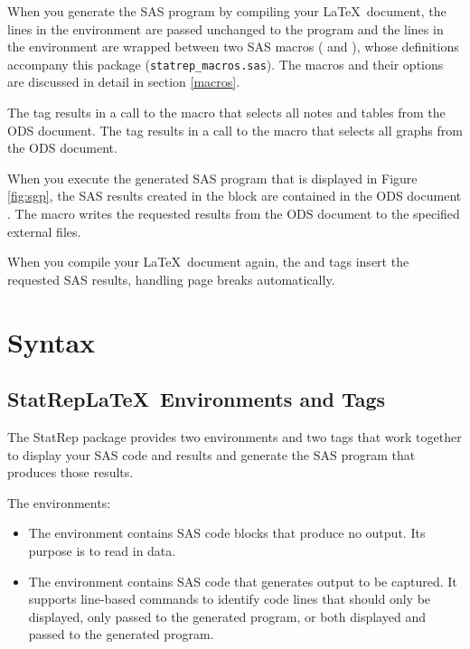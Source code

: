 \documentclass[article,oneside]{memoir}
\newcommand*{\StatRep}{\textsf{StatRep}\xspace}
\begin{document}
  When you generate the SAS program by compiling your \LaTeX\ document, 
  the lines in the  environment are passed unchanged to the program
  and 
  the lines in the  
  environment are wrapped between two SAS macros ( and ), 
  whose definitions accompany this package (\texttt{statrep\_macros.sas}). 
  The macros and their options are discussed in detail in section \ref{macros}.
  
  The  tag results in a call to the  macro that selects all notes and tables from the ODS document. 
  The  tag results in a call to the  macro that selects all graphs from the ODS document.
  
  When you execute the generated SAS program that is displayed 
  in Figure \ref{fig:sgp}, the SAS results created in the  block are contained
  in the ODS document . The  macro writes the requested results from the ODS document
  to the specified 
  external files.
  
  When you compile your \LaTeX\ document again, the  and  tags 
  insert the requested SAS results, handling page breaks automatically.
 
\chapter{Syntax}
\section{\StatRep \LaTeX\ Environments and Tags}
     The \StatRep package provides two environments and two tags that work
     together to display your SAS code and results and generate the SAS program
     that produces those results.
     
     The environments:
     \begin{itemize}
     \item The  environment contains SAS code blocks that produce no output. 
     Its purpose is to read in data. 
     \item The  environment contains SAS code that generates output to be 
     captured. It supports line-based commands to identify 
     code lines that should only be displayed, only passed to the generated program,
     or both displayed and passed to the generated program.
     \end{itemize}
     
\end{document}

